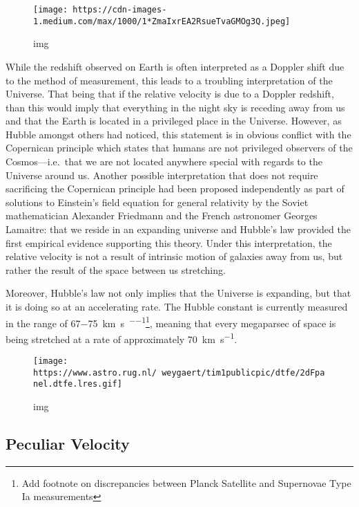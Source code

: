 \begin{figure}
\centering
\texttt{[image: https://cdn-images-1.medium.com/max/1000/1*ZmaIxrEA2RsueTvaGMOg3Q.jpeg]}
\caption{img}
\end{figure}

While the redshift observed on Earth is often interpreted as a Doppler
shift due to the method of measurement, this leads to a troubling
interpretation of the Universe. That being that if the relative velocity
is due to a Doppler redshift, than this would imply that everything in
the night sky is receding away from us and that the Earth is located in
a privileged place in the Universe. However, as Hubble amongst others
had noticed, this statement is in obvious conflict with the Copernican
principle which states that humans are not privileged observers of the
Cosmos---i.e.~that we are not located anywhere special with regards to
the Universe around us. Another possible interpretation that does not
require sacrificing the Copernican principle had been proposed
independently as part of solutions to Einstein's field equation for
general relativity by the Soviet mathematician Alexander Friedmann and
the French astronomer Georges Lamaitre: that we reside in an expanding
universe and Hubble's law provided the first empirical evidence
supporting this theory. Under this interpretation, the relative velocity
is not a result of intrinsic motion of galaxies away from us, but rather
the result of the space between us stretching.

Moreover, Hubble's law not only implies that the Universe is expanding,
but that it is doing so at an accelerating rate. The Hubble constant is
currently measured in the range of
\SI{67-75}{\km\per\s\per\Mpc}\footnote{Add footnote on discrepancies between Planck Satellite and Supernovae Type Ia measurements},
meaning that every megaparsec of space is being stretched at a rate of
approximately \SI{70}{\km\per\s}.

\begin{figure}
\centering
\texttt{[image: https://www.astro.rug.nl/~weygaert/tim1publicpic/dtfe/2dFpanel.dtfe.lres.gif]}
\caption{img}
\end{figure}

\subsection{Peculiar Velocity}\label{peculiar-velocity}

